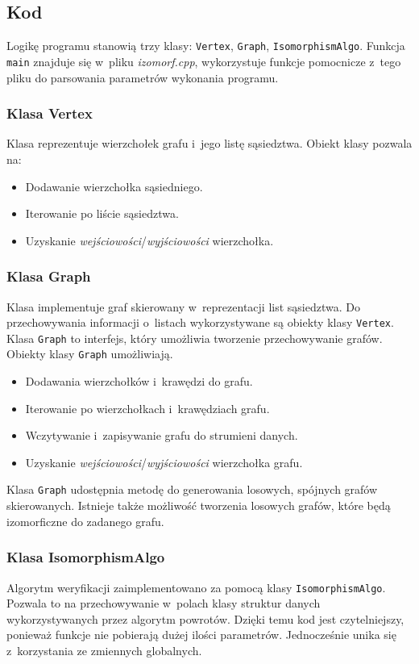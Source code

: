 \documentclass[12pt, a4paper, ]{article} %
\begin{document}
\subsection{Kod}
Logikę programu stanowią trzy klasy: \texttt{Vertex}, \texttt{Graph}, \texttt{IsomorphismAlgo}.
Funkcja \texttt{main} znajduje się w~pliku \textit{izomorf.cpp}, wykorzystuje funkcje pomocnicze
z~tego pliku do parsowania parametrów wykonania programu.

\subsubsection{Klasa Vertex}
Klasa reprezentuje wierzchołek grafu i~jego listę sąsiedztwa. Obiekt klasy pozwala na:
\begin{itemize}
  \item Dodawanie wierzchołka sąsiedniego.
  \item Iterowanie po liście sąsiedztwa.
  \item Uzyskanie \textit{wejściowości}/\textit{wyjściowości} wierzchołka.
\end{itemize}


\subsubsection{Klasa Graph}
Klasa implementuje graf skierowany w~reprezentacji list sąsiedztwa. Do przechowywania informacji o~listach
wykorzystywane są obiekty klasy \texttt{Vertex}. Klasa \texttt{Graph} to interfejs, który umożliwia
tworzenie przechowywanie grafów. Obiekty klasy \texttt{Graph} umożliwiają.
\begin{itemize}
  \item Dodawania wierzchołków i~krawędzi do grafu.
  \item Iterowanie po wierzchołkach i~krawędziach grafu.
  \item Wczytywanie i~zapisywanie grafu do strumieni danych.
  \item Uzyskanie \textit{wejściowości}/\textit{wyjściowości} wierzchołka grafu.
\end{itemize}

Klasa \texttt{Graph} udostępnia metodę do generowania losowych, spójnych grafów skierowanych.
Istnieje także możliwość tworzenia losowych grafów, które będą izomorficzne do zadanego grafu.


\subsubsection{Klasa IsomorphismAlgo}
Algorytm weryfikacji zaimplementowano za pomocą klasy \texttt{IsomorphismAlgo}. Pozwala to na
przechowywanie w~polach klasy struktur danych wykorzystywanych przez algorytm powrotów. Dzięki
temu kod jest czytelniejszy, ponieważ funkcje nie pobierają dużej ilości parametrów. Jednocześnie
unika się z~korzystania ze zmiennych globalnych.
\end{document}
